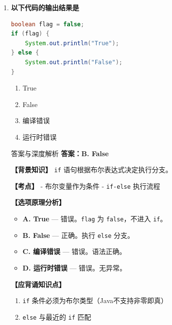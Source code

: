 \documentclass[12pt, a4paper]{ctexart} %
\newcommand{\code}[1]{\texttt{#1}}
\begin{document}
\begin{enumerate}[label=\textbf{\arabic*.}]
\begin{bluebox}{答案与深度解析}
		      \textbf{【应背诵知识点】}
		      \begin{enumerate}
			      \item \code{\&\&} 和 \code{||} 是短路的
			      \item \code{\&} 和 \code{|} 作用于布尔时是非短路的
			      \item 优先级：\code{!} > \code{\&\&} > \code{||}
		      \end{enumerate}
	      \end{bluebox}

	      \vspace{1em}

	\item \textbf{以下代码的输出结果是}
	      \begin{lstlisting}[language=Java]
boolean flag = false;
if (flag) {
    System.out.println("True");
} else {
    System.out.println("False");
}
\end{lstlisting}
	      \begin{enumerate}[label=\Alph*.]
		      \item True
		      \item False
		      \item 编译错误
		      \item 运行时错误
	      \end{enumerate}

	      \begin{bluebox}{答案与深度解析}
		      \textbf{答案：B. False}

		      \textbf{【背景知识】}
		      \code{if} 语句根据布尔表达式决定执行分支。

		      \textbf{【考点】}
		      - 布尔变量作为条件
		      - \code{if-else} 执行流程

		      \textbf{【选项原理分析】}
		      \begin{itemize}[leftmargin=*]
			      \item \textbf{A. True} — 错误。\code{flag} 为 \code{false}，不进入 \code{if}。
			      \item \textbf{B. False} — 正确。执行 \code{else} 分支。
			      \item \textbf{C. 编译错误} — 错误。语法正确。
			      \item \textbf{D. 运行时错误} — 错误。无异常。
		      \end{itemize}

		      \textbf{【应背诵知识点】}
		      \begin{enumerate}
			      \item \code{if} 条件必须为布尔类型（Java不支持非零即真）
			      \item \code{else} 与最近的 \code{if} 匹配
		      \end{enumerate}
	      \end{bluebox}

\end{enumerate}
\end{document}

